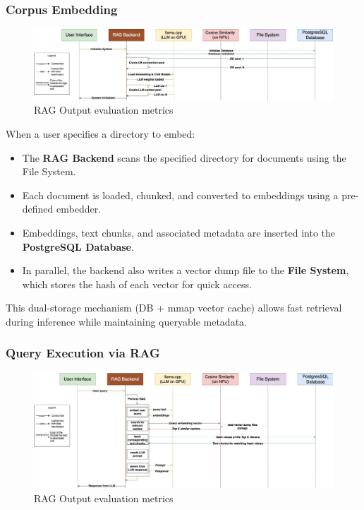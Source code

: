 {\subsubsection{Corpus Embedding}

\begin{figure}[H]
    \centering
    \includegraphics[width=1.0\linewidth]{images/tldr-app-worklfow-pt1.jpg}
    \caption{RAG Output evaluation metrics ~\cite{cardenas2023rag}}
    \label{fig:autoregressive_decoding}
\end{figure}

When a user specifies a directory to embed:

\begin{itemize}
    \item The \textbf{RAG Backend} scans the specified directory for documents using the File System.
    \item Each document is loaded, chunked, and converted to embeddings using a pre-defined embedder.
    \item Embeddings, text chunks, and associated metadata are inserted into the \textbf{PostgreSQL Database}.
    \item In parallel, the backend also writes a vector dump file to the \textbf{File System}, which stores the hash of each vector for quick access.
\end{itemize}

This dual-storage mechanism (DB + mmap vector cache) allows fast retrieval during inference while maintaining queryable metadata.

\subsubsection{Query Execution via RAG}

\begin{figure}[H]
    \centering
    \includegraphics[width=1.0\linewidth]{images/tldr-app-worklfow-pt3.jpg}
    \caption{RAG Output evaluation metrics ~\cite{cardenas2023rag}}
    \label{fig:autoregressive_decoding}
\end{figure}

}
